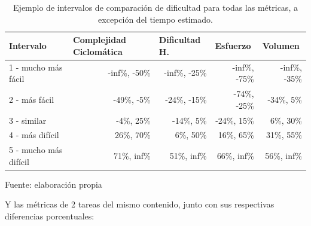 \documentclass[letterpaper,12pt]{article}
\begin{document}
\begin{table}[H]
  \centering
  \begin{tabular}{|l|r|r|r|r|}
    \hline
    \textbf{Intervalo}    & \multicolumn{1}{l|}{\textbf{Complejidad Ciclomática}} & \multicolumn{1}{l|}{\textbf{Dificultad H.}} & \multicolumn{1}{l|}{\textbf{Esfuerzo}} & \multicolumn{1}{l|}{\textbf{Volumen}} \\ \hline
    1 - mucho más fácil   & -inf\%, -50\%                                         & -inf\%, -25\%                               & -inf\%, -75\%                          & -inf\%, -35\%                         \\ \hline
    2 - más fácil         & -49\%, -5\%                                           & -24\%, -15\%                                & -74\%, -25\%                           & -34\%, 5\%                            \\ \hline
    3 - similar           & -4\%, 25\%                                            & -14\%, 5\%                                  & -24\%, 15\%                            & 6\%, 30\%                             \\ \hline
    4 - más difícil       & 26\%, 70\%                                            & 6\%, 50\%                                   & 16\%, 65\%                             & 31\%, 55\%                            \\ \hline
    5 - mucho más difícil & 71\%, inf\%                                           & 51\%, inf\%                                 & 66\%, inf\%                            & 56\%, inf\%                           \\ \hline
  \end{tabular}
  \caption{Ejemplo de intervalos de comparación de dificultad para todas las métricas, a excepción del tiempo estimado.} Fuente: elaboración propia
  \label{tab:example-difficulty-interval}
\end{table}

Y las métricas de 2 tareas del mismo contenido, junto con sus respectivas diferencias porcentuales:
\end{document}
